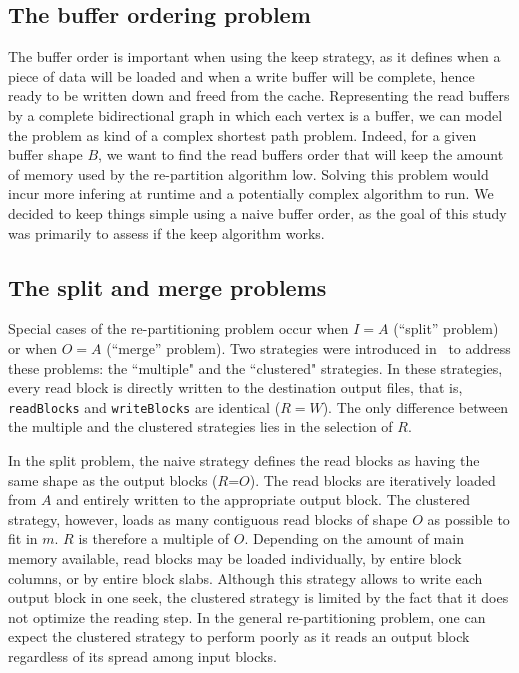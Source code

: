 \documentclass[sigconf, nonacm]{acmart}
\begin{document}
\subsection{The buffer ordering problem}
The buffer order is important when using the keep strategy, as it defines when
a piece of data will be loaded and when a write buffer will be complete, hence
ready to be written down and freed from the cache.
Representing the read buffers by a complete bidirectional graph in which each
vertex is a buffer, we can model the problem as kind of a complex shortest path
problem.
Indeed, for a given buffer shape $B$, we want to find the read buffers order
that will keep the amount of memory used by the re-partition algorithm low.
Solving this problem would incur more infering at runtime and a potentially
complex algorithm to run.
We decided to keep things simple using a naive buffer order, as the goal of
this study was primarily to assess if the keep algorithm works.

\subsection{The split and merge problems}

Special cases of the re-partitioning problem occur when $I=A$ (``split'' problem)
or when $O=A$ (``merge'' problem). Two strategies were introduced
in~\cite{seqalgorithms} to address these problems: the ``multiple" and the
``clustered" strategies. In these strategies, every read block is directly written to the
destination output files, that is, \texttt{readBlocks} and \texttt{writeBlocks} are identical ($R=W$).
The only difference between the multiple and the clustered strategies lies in
the selection of $R$.

In the split problem, the naive
strategy defines the read blocks as having the same shape as the output blocks
($R$=$O$). The read blocks are iteratively loaded from $A$ and entirely written
to the appropriate output block.
The clustered strategy, however, loads as
many contiguous read blocks of shape $O$ as possible to fit in $m$.
$R$ is therefore a multiple of $O$.
Depending on the amount of main memory available, read blocks may be loaded
individually, by entire block columns, or by entire block slabs.
Although this strategy allows to write each output block in one seek, the clustered strategy is limited by the fact
that it does not optimize the reading step.
In the general re-partitioning problem, one can expect the clustered strategy to
perform poorly as it reads an output block regardless of its spread among input blocks.
\end{document}

